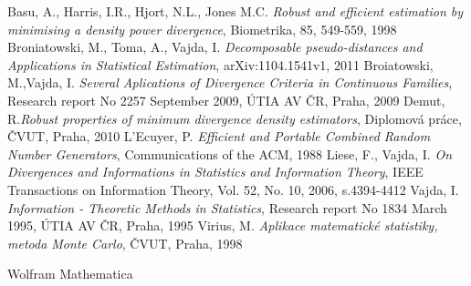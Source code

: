 \begin{thebibliography}{10}

%

Basu, A., Harris, I.R., Hjort, N.L., Jones M.C. {\em Robust and efficient estimation by minimising a density power divergence}, Biometrika, 85, 549-559, 1998
Broniatowski, M., Toma, A., Vajda, I. {\em Decomposable pseudo-distances and Applications in Statistical Estimation}, arXiv:1104.1541v1, 2011
Broiatowski, M.,Vajda, I. {\em Several Aplications of Divergence Criteria in Continuous Families}, Research report No 2257 September 2009, ÚTIA AV ČR, Praha, 2009
Demut, R.{\em Robust properties of minimum divergence density estimators}, Diplomová práce, ČVUT, Praha, 2010
L'Ecuyer, P. {\em Efficient and Portable Combined Random Number Generators}, Communications of the ACM, 1988
Liese, F., Vajda, I. {\em On Divergences and Informations in Statistics and Information Theory}, IEEE Transactions on Information Theory, Vol. 52, No. 10, 2006, s.4394-4412
Vajda, I. {\em Information - Theoretic Methods in Statistics}, Research report No 1834 March 1995, ÚTIA AV ČR, Praha, 1995
Virius, M. {\em Aplikace matematické statistiky, metoda Monte Carlo}, ČVUT, Praha, 1998

Wolfram Mathematica

\end{thebibliography}